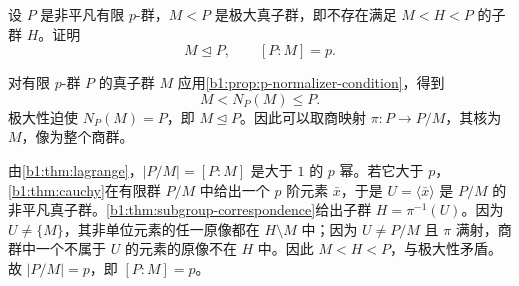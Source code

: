\begin{exercise}\label{b1:ex:05-maximal-p-subgroup}
	设 \(P\) 是非平凡有限 \(p\)-群，\(M<P\) 是极大真子群，即不存在满足 \(M<H<P\) 的子群 \(H\)。证明
	\[
		M\trianglelefteq P,\qquad [P:M]=p.
	\]
\end{exercise}
\begin{solution}
	对有限 \(p\)-群 \(P\) 的真子群 \(M\) 应用\cref{b1:prop:p-normalizer-condition}，得到
	\[
		M<N_P(M)\leq P.
	\]
	极大性迫使 \(N_P(M)=P\)，即 \(M\trianglelefteq P\)。因此可以取商映射 \(\pi:P\rightarrow P/M\)，其核为 \(M\)，像为整个商群。

	由\cref{b1:thm:lagrange}，\(|P/M|=[P:M]\) 是大于 \(1\) 的 \(p\) 幂。若它大于 \(p\)，\cref{b1:thm:cauchy}在有限群 \(P/M\) 中给出一个 \(p\) 阶元素 \(\bar x\)，于是 \(U=\langle\bar x\rangle\) 是 \(P/M\) 的非平凡真子群。\cref{b1:thm:subgroup-correspondence}给出子群 \(H=\pi^{-1}(U)\)。因为 \(U\ne\{M\}\)，其非单位元素的任一原像都在 \(H\setminus M\) 中；因为 \(U\ne P/M\) 且 \(\pi\) 满射，商群中一个不属于 \(U\) 的元素的原像不在 \(H\) 中。因此 \(M<H<P\)，与极大性矛盾。故 \(|P/M|=p\)，即 \([P:M]=p\)。
\end{solution}
